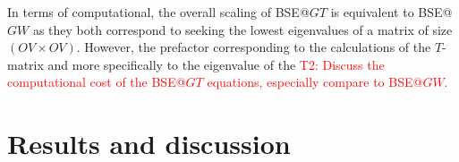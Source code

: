 \documentclass[aip,jcp,reprint,noshowkeys,superscriptaddress]{revtex4-1}
\newcommand{\titou}[1]{\textcolor{red}{#1}}
\newcommand{\Norb}{N_\text{orb}}
\newcommand{\Nocc}{O}
\newcommand{\Nvir}{V}
\begin{document}
In terms of computational, the overall scaling of BSE@$GT$ is equivalent to BSE@$GW$ as they both correspond to seeking the lowest eigenvalues of a matrix of size $(\Nocc \Nvir \times \Nocc \Nvir)$. 
However, the prefactor corresponding to the calculations of the $T$-matrix and more specifically to the eigenvalue of the \titou{T2: Discuss the computational cost of the BSE@$GT$ equations, especially compare to BSE@$GW$.}
%



\section{Results and discussion}
\label{sec:res}
\end{document}
